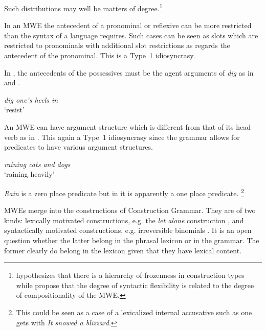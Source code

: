 \documentclass[output=paper]{langsci/langscibook}
\begin{document}
\noindent
Such distributions may well be matters of degree.\footnote{\citet{Fraser1970} hypothesizes that there is a hierarchy of frozenness in construction types while \citet{Nunberg1994} propose that the degree of syntactic flexibility is related to the degree of compositionality of the MWE.
} 

In an MWE the antecedent of a pronominal or reflexive can be more restricted than the syntax of a language requires. Such cases can be seen as slots which are restricted to pronominals with additional slot restrictions as regards the antecedent of the pronominal. This is a Type~1 idiosyncrasy.
 
In , the antecedents of the possessives must be the agent arguments of \textit{dig} as in  and .

\begin{exe}
\ex\label{ex:ex46} \textit{dig one's heels in}\\
‘resist’ 
\begin{xlist}

\end{xlist}
\end{exe}

An MWE can have argument structure which is different from that of its head verb as in . This again a Type~1 idiosyncrasy since the grammar allows for predicates to have various argument structures.

\begin{exe}
\ex\label{ex:ex49} \textit{raining cats and dogs}\\
‘raining heavily’
\end{exe}

\noindent
\textit{Rain} is a zero place predicate but in  it is 
apparently a one place predicate.%
\footnote{This could be seen as a case of a lexicalized internal accusative such as one gets with \textit{It snowed a blizzard}.}  

MWEs merge into the constructions of  Construction Grammar. They are of two kinds: lexically motivated constructions, e.g. the \textit{let alone} construction \citep{FillmoreEtAl1988}, and syntactically motivated constructions, e.g. irreversible binomials \citep{Malkiel1959}. It is an open question whether the latter belong in the phrasal lexicon or in the grammar. The former clearly do belong in the lexicon given that they have lexical content.
\end{document}
